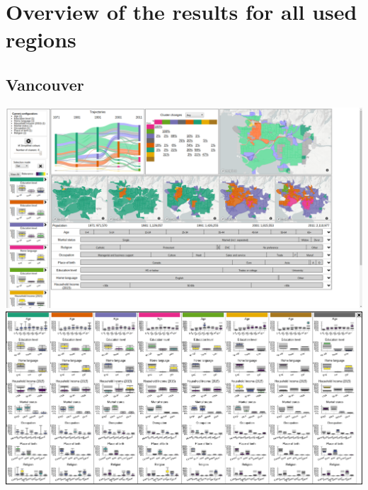\documentclass[a4paper]{article}
\begin{document}
\clearpage
\section{Overview of the results for all used regions}

\subsection{Vancouver}
\begin{center}
    \includegraphics[width=\linewidth]{39a.png}
    \includegraphics[width=\linewidth]{39b.png}
\end{center}
\end{document}
